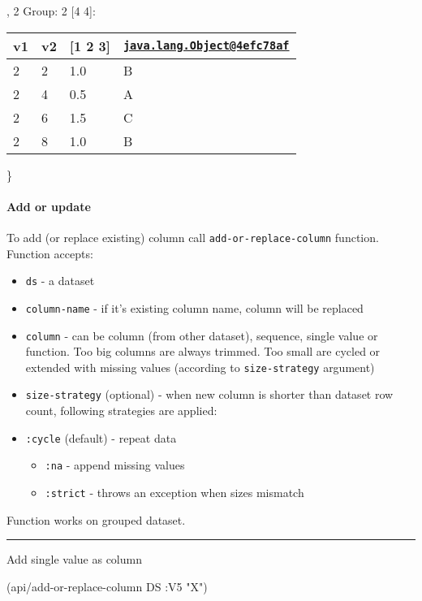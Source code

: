 \documentclass[]{article}
\newenvironment{Shaded}{\begin{snugshade}}{\end{snugshade}}
\newcommand{\AttributeTok}[1]{\textcolor[rgb]{0.77,0.63,0.00}{#1}}
\newcommand{\NormalTok}[1]{#1}
\newcommand{\StringTok}[1]{\textcolor[rgb]{0.31,0.60,0.02}{#1}}
\providecommand{\tightlist}{%
  \setlength{\itemsep}{0pt}\setlength{\parskip}{0pt}}
\let\oldparagraph\paragraph
\renewcommand{\paragraph}[1]{\oldparagraph{#1}\mbox{}}
\begin{document}
, 2 Group: 2 {[}4 4{]}:

\begin{longtable}[]{@{}llll@{}}
\toprule
v1 & v2 & {[}1 2 3{]} &
\href{mailto:java.lang.Object@4efc78af}{\nolinkurl{java.lang.Object@4efc78af}}\tabularnewline
\midrule
\endhead
2 & 2 & 1.0 & B\tabularnewline
2 & 4 & 0.5 & A\tabularnewline
2 & 6 & 1.5 & C\tabularnewline
2 & 8 & 1.0 & B\tabularnewline
\bottomrule
\end{longtable}

\}

\hypertarget{add-or-update}{%
\paragraph{Add or update}\label{add-or-update}}

To add (or replace existing) column call \texttt{add-or-replace-column}
function. Function accepts:

\begin{itemize}
\tightlist
\item
  \texttt{ds} - a dataset
\item
  \texttt{column-name} - if it's existing column name, column will be
  replaced
\item
  \texttt{column} - can be column (from other dataset), sequence, single
  value or function. Too big columns are always trimmed. Too small are
  cycled or extended with missing values (according to
  \texttt{size-strategy} argument)
\item
  \texttt{size-strategy} (optional) - when new column is shorter than
  dataset row count, following strategies are applied:
\item
  \texttt{:cycle} (default) - repeat data

  \begin{itemize}
  \tightlist
  \item
    \texttt{:na} - append missing values
  \item
    \texttt{:strict} - throws an exception when sizes mismatch
  \end{itemize}
\end{itemize}

Function works on grouped dataset.

\begin{center}\rule{0.5\linewidth}{0.5pt}\end{center}

Add single value as column

\begin{Shaded}
\begin{Highlighting}[]
\NormalTok{(api/add-or-replace-column DS }\AttributeTok{:V5} \StringTok{"X"}\NormalTok{)}
\end{Highlighting}
\end{Shaded}
\end{document}
